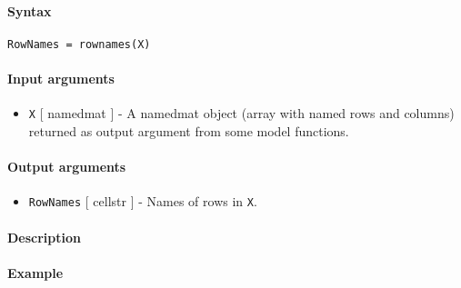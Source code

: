 


	\paragraph{Syntax}

\begin{verbatim}
RowNames = rownames(X)
\end{verbatim}

\paragraph{Input arguments}

\begin{itemize}
\itemsep1pt\parskip0pt
\item
  \texttt{X} {[} namedmat {]} - A namedmat object (array with named rows
  and columns) returned as output argument from some model functions.
\end{itemize}

\paragraph{Output arguments}

\begin{itemize}
\itemsep1pt\parskip0pt
\item
  \texttt{RowNames} {[} cellstr {]} - Names of rows in \texttt{X}.
\end{itemize}

\paragraph{Description}

\paragraph{Example}


